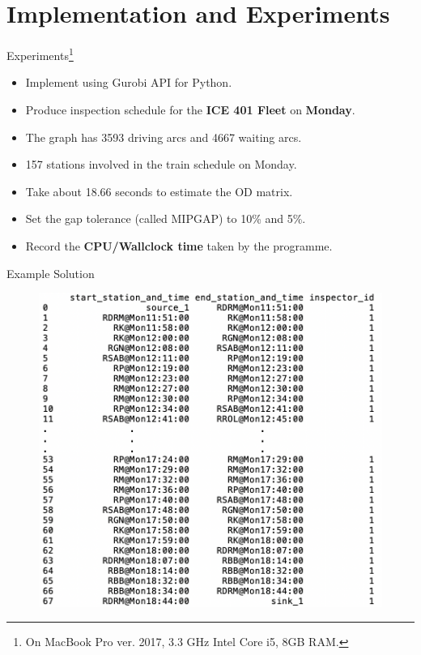 \documentclass[handout]{beamer}
\begin{document}
\section{Implementation and Experiments}
\begin{frame}{Experiments\footnote{On MacBook Pro ver. 2017, 3.3 GHz Intel Core i5, 8GB RAM.}}
\begin{itemize}
    \item Implement using Gurobi API for Python.
    \item Produce inspection schedule for the \textbf{ICE 401 Fleet} on \textbf{Monday}.
\item The graph has 3593
driving arcs and 4667 waiting arcs. 
\item 157 stations involved in the train schedule on Monday.
\item Take about 18.66 seconds to estimate the OD matrix.
\item Set the gap tolerance (called MIPGAP)  to 10\% and 5\%.
\item Record the \textbf{CPU/Wallclock time} taken by the programme.
\end{itemize}
 \end{frame}
 
 \begin{frame}{Example Solution}
     \begin{figure}
         \centering
         \includegraphics[scale=0.5]{example_sol.png}
     \end{figure}
 \end{frame}
\end{document}
